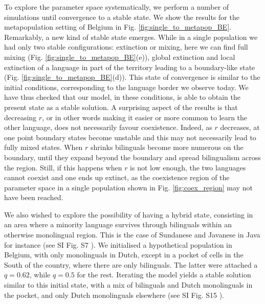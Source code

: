 \documentclass[../thesis.tex]{subfiles}
\begin{document}
To explore the parameter space systematically, we perform a number of simulations until
convergence to a stable state. We show the results for the metapopulation setting of
Belgium in Fig. \cref{fig:single_to_metapop_BE}. Remarkably, a new kind of stable state
emerges. While in a single population we had only two stable configurations: extinction
or mixing, here we can find full mixing (Fig. \cref{fig:single_to_metapop_BE}(e)),
global extinction and local extinction of a language in part of the territory leading to
a boundary-like state (Fig. \cref{fig:single_to_metapop_BE}(d)). This state of
convergence is similar to the initial conditions, corresponding to the language border
we observe today. We have thus checked that our model, in these conditions, is able to
obtain the present state as a stable solution. A surprising aspect of the results is
that decreasing $r$, or in other words making it easier or more common to learn the
other language, does not necessarily favour coexistence. Indeed, as $r$ decreases, at one
point boundary states become unstable and this may not necessarily lead to fully mixed
states. When $r$ shrinks bilinguals become more numerous on the boundary, until they
expand beyond the boundary and spread bilingualism across the region. Still, if this
happens when $r$ is not low enough, the two languages cannot coexist and one ends up
extinct, as the coexistence region of the parameter space in a single population shown
in Fig. \cref{fig:coex_region} may not have been reached. 

We also wished to explore the possibility of having a hybrid state, consisting in an
area where a minority language survives through bilinguals within an otherwise
monolingual region. This is the case of Sundanese and Javanese in Java for instance (see
SI Fig. S7 \cite{supp}). We initialised a hypothetical population in Belgium, with only
monolinguals in Dutch, except in a pocket of cells in the South of the country, where
there are only bilinguals. The latter were attached a $q = 0.62$, while $q = 0.5$ for
the rest. Iterating the model yields a stable solution similar to this initial state,
with a mix of bilinguals and Dutch monolinguals in the pocket, and only Dutch
monolinguals elsewhere (see SI Fig. S15 \cite{supp}).
\end{document}
